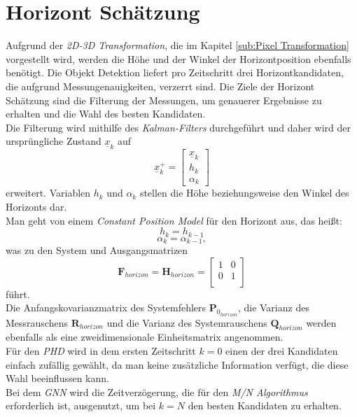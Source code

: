 \documentclass[10pt,a4paper]{article}
\begin{document}
\section{Horizont Schätzung}
Aufgrund der \textit{2D-3D Transformation}, die im Kapitel \ref{sub:Pixel Transformation} vorgestellt wird, werden die Höhe und der Winkel der Horizontposition ebenfalls benötigt. Die Objekt Detektion liefert pro Zeitschritt drei Horizontkandidaten, die aufgrund Messungenauigkeiten, verzerrt sind. Die Ziele der Horizont Schätzung sind die Filterung der Messungen, um genauerer Ergebnisse zu erhalten und die Wahl des besten Kandidaten.\\
Die Filterung wird mithilfe des \textit{Kalman-Filters} durchgeführt und daher wird der ursprüngliche Zustand $\underline{x}_{k}$ auf 
\begin{equation}
\underline{x}^+_{k} = \begin{bmatrix}
\underline{x}_{k} \\
h_{k}\\
\alpha_{k}
\end{bmatrix}
\end{equation}
erweitert. Variablen $h_{k}$ und $\alpha_{k}$ stellen die Höhe beziehungsweise den Winkel des Horizonts dar.\\
Man geht von einem \textit{Constant Position Model} für den Horizont aus, das heißt:\\
\begin{equation}
h_k = h_{k-1}
\end{equation}
\begin{equation*}
\alpha_k = \alpha_{k-1},
\end{equation*}
was zu den System und Ausgangsmatrizen
\begin{equation}
\textbf{F}_{horizon} = \textbf{H}_{horizon} = \begin{bmatrix}
1 & 0  \\
0 & 1\\
\end{bmatrix}
\end{equation}
führt.\\
Die Anfangskovarianzmatrix des Systemfehlers $\textbf{P}_{0_{horizon}}$, die Varianz des Messrauschens $\textbf{R}_{horizon}$ und die Varianz des Systemrauschens $\textbf{Q}_{horizon}$ werden ebenfalls als eine zweidimensionale Einheitsmatrix angenommen.\\
Für den \textit{PHD} wird in dem ersten Zeitschritt $k = 0$ einen der drei Kandidaten einfach zufällig gewählt, da man keine zusätzliche Information verfügt, die diese Wahl beeinflussen kann.\\
Bei dem \textit{GNN} wird die Zeitverzögerung, die für den \textit{M/N Algorithmus} erforderlich ist, ausgenutzt, um bei $k = N$ den besten Kandidaten zu erhalten.
\end{document}

